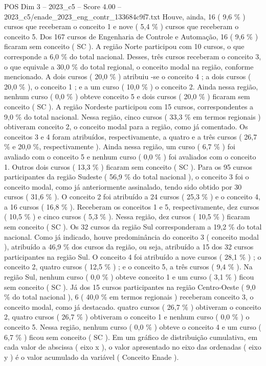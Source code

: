 \begin{textsample}{POS Dim 3 – 2023\_c5 – Score 4.00 – 2023\_c5/enade\_2023\_eng\_contr\_133684c9f7.txt}
Houve, ainda, 16 ( 9,6 \% ) cursos que receberam o conceito 1 e nove ( 5,4 \% ) cursos que receberam o conceito 5.
Dos 167 cursos de Engenharia de Controle e Automação, 16 ( 9,6 \% ) ficaram sem conceito ( SC ).
A região Norte participou com 10 cursos, o que corresponde a 6,0 \% do total nacional.
Desses, três cursos receberam o conceito 3, o que equivale a 30,0 \% do total regional, o conceito modal na região, conforme mencionado.
A dois cursos ( 20,0 \% ) atribuiu -se o conceito 4 ; a dois cursos ( 20,0 \% ), o conceito 1 ; e a um curso ( 10,0 \% ) o conceito 2.
Ainda nessa região, nenhum curso ( 0,0 \% ) obteve conceito 5 e dois cursos ( 20,0 \% ) ficaram sem conceito ( SC ).
A região Nordeste participou com 15 cursos, correspondentes a 9,0 \% do total nacional.
Nessa região, cinco cursos ( 33,3 \% em termos regionais ) obtiveram conceito 2, o conceito modal para a região, como já comentado.
Os conceitos 3 e 4 foram atribuídos, respectivamente, a quatro e a três cursos ( 26,7 \% e 20,0 \%, respectivamente ).
Ainda nessa região, um curso ( 6,7 \% ) foi avaliado com o conceito 5 e nenhum curso ( 0,0 \% ) foi avaliados com o conceito 1.
Outros dois cursos ( 13,3 \% ) ficaram sem conceito ( SC ).
Para os 95 cursos participantes da região Sudeste ( 56,9 \% do total nacional ), o conceito 3 foi o conceito modal, como já anteriormente assinalado, tendo sido obtido por 30 cursos ( 31,6 \% ).
O conceito 2 foi atribuído a 24 cursos ( 25,3 \% ) e o conceito 4, a 16 cursos ( 16,8 \% ).
Receberam os conceitos 1 e 5, respectivamente, dez cursos ( 10,5 \% ) e cinco cursos ( 5,3 \% ).
Nessa região, dez cursos ( 10,5 \% ) ficaram sem conceito ( SC ).
Os 32 cursos da região Sul corresponderam a 19,2 \% do total nacional.
Como já indicado, houve predominância do conceito 3 ( conceito modal ), atribuído a 46,9 \% dos cursos da região, ou seja, atribuído a 15 dos 32 cursos participantes na região Sul.
O conceito 4 foi atribuído a nove cursos ( 28,1 \% ) ; o conceito 2, quatro cursos ( 12,5 \% ) ; e o conceito 5, a três cursos ( 9,4 \% ).
Na região Sul, nenhum curso ( 0,0 \% ) obteve conceito 1 e um curso ( 3,1 \% ) ficou sem conceito ( SC ).
Já dos 15 cursos participantes na região Centro-Oeste ( 9,0 \% do total nacional ), 6 ( 40,0 \% em termos regionais ) receberam conceito 3, o conceito modal, como já destacado. quatro cursos ( 26,7 \% ) obtiveram o conceito 2, quatro cursos ( 26,7 \% ) obtiveram o conceito 1 e nenhum curso ( 0,0 \% ) o conceito 5.
Nessa região, nenhum curso ( 0,0 \% ) obteve o conceito 4 e um curso ( 6,7 \% ) ficou sem conceito ( SC ).
Em um gráfico de distribuição cumulativa, em cada valor de abscissa ( eixo x ), o valor apresentado no eixo das ordenadas ( eixo y ) é o valor acumulado da variável ( Conceito Enade ).

\end{textsample}
